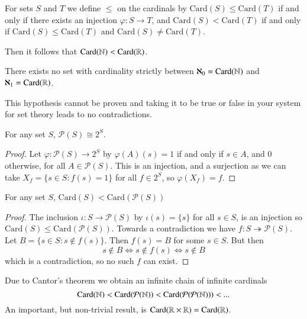 \begin{subappendices}
    \begin{defn}
        For sets $S$ and $T$ we define $\leq$ on the cardinals by $\text{Card}(S)\leq \text{Card}(T)$ if and only if there exists an injection $\varphi:S\rightarrow T$, and $\text{Card}(S) < \text{Card}(T)$ if and only if $\text{Card}(S) \leq \text{Card}(T)$ and $\text{Card}(S) \neq \text{Card}(T)$.
    \end{defn}

    Then it follows that $\text{Card}(\mathbb N) < \text{Card}(\mathbb R)$. 

    \begin{cust}
        There exists no set with cardinality strictly between $\aleph_0 = \text{Card}(\mathbb N)$ and $\aleph_1 = \text{Card}(\mathbb R)$.
    \end{cust}

    This hypothesis cannot be proven and taking it to be true or false in your system for set theory leads to no contradictions.

    \begin{prop}
        For any set $S$, $\mathcal{P}(S) \cong 2^S$.
    \end{prop}
    \begin{proof}
        Let $\varphi:\mathcal{P}(S)\rightarrow 2^S$ by $\varphi(A)(s) = 1$ if and only if $s \in A$, and $0$ otherwise, for all $A \in \mathcal{P}(S)$. This is an injection, and a surjection as we can take $X_f = \{s \in S: f(s) = 1\}$ for all $f \in 2^S$, so $\varphi(X_f) = f$.
    \end{proof}

    \begin{prop}
        For any set $S$, $\text{Card}(S) < \text{Card}(\mathcal{P}(S))$
    \end{prop}
    \begin{proof}
        The inclusion $\iota:S\rightarrow \mathcal{P}(S)$ by $\iota(s) = \{s\}$ for all $s \in S$, is an injection so $\text{Card}(S) \leq \text{Card}(\mathcal{P}(S))$. Towards a contradiction we have $f:S\twoheadrightarrow \mathcal{P}(S)$. Let $B = \{s \in S:s \notin f(s)\}$. Then $f(s) = B$ for some $s \in S$. But then $$s \notin B \iff s \notin f(s) \iff s \notin B$$ which is a contradiction, so no such $f$ can exist.
    \end{proof}

    Due to Cantor's theorem we obtain an infinite chain of infinite cardinals $$\text{Card}(\mathbb N) < \text{Card}(\mathcal{P}(\mathbb N)) < \text{Card}(\mathcal{P}(\mathcal{P}(\mathbb N))) < ...$$
    An important, but non-trivial result, is $\text{Card}(\mathbb R\times \mathbb R) = \text{Card}(\mathbb R)$.


\end{subappendices}
